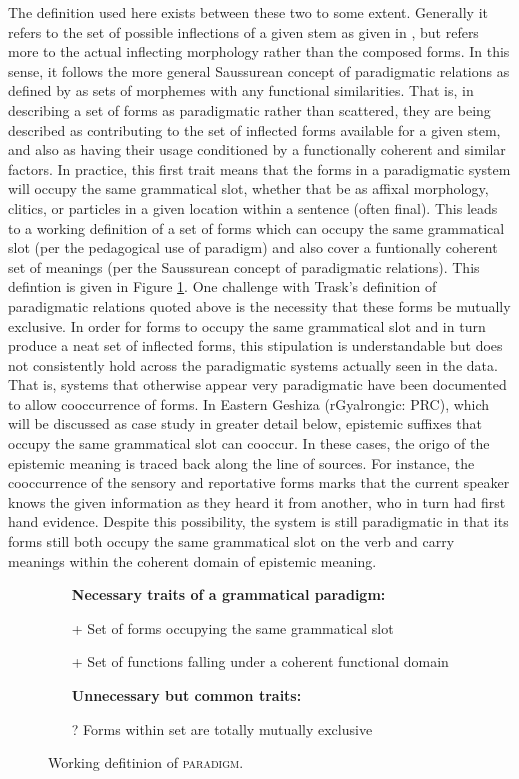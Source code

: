 The definition used here exists between these two to some extent. Generally it refers to the set of possible inflections of a given stem as given in , but refers more to the actual inflecting morphology rather than the composed forms. In this sense, it follows the more general Saussurean concept of paradigmatic relations as defined by  as sets of morphemes with any functional similarities. That is, in describing a set of forms as paradigmatic rather than scattered, they are being described as contributing to the set of inflected forms available for a given stem, and also as having their usage conditioned by a functionally coherent and similar factors. In practice, this first trait means that the forms in a paradigmatic system will occupy the same grammatical slot, whether that be as affixal morphology, clitics, or particles in a given location within a sentence (often final). This leads to a working definition of a set of forms which can occupy the same grammatical slot (per the pedagogical use of paradigm) and also cover a funtionally coherent set of meanings (per the Saussurean concept of paradigmatic relations). This defintion is given in Figure \ref{f:Discussion:Paradigm}. One challenge with Trask's definition of paradigmatic relations quoted above is the necessity that these forms be mutually exclusive. In order for forms to occupy the same grammatical slot and in turn produce a neat set of inflected forms, this stipulation is understandable but does not consistently hold across the paradigmatic systems actually seen in the data. That is, systems that otherwise appear very paradigmatic have been documented to allow cooccurrence of forms. In Eastern Geshiza (rGyalrongic: PRC), which will be discussed as case study in greater detail below, epistemic suffixes that occupy the same grammatical slot can cooccur. In these cases, the origo of the epistemic meaning is traced back along the line of sources. For instance, the cooccurrence of the sensory and reportative forms marks that the current speaker knows the given information as they heard it from another, who in turn had first hand evidence. Despite this possibility, the system is still paradigmatic in that its forms still both occupy the same grammatical slot on the verb and carry meanings within the coherent domain of epistemic meaning.

\begin{figure}
    \begin{itemize}
        \item[] \textbf{Necessary traits of a grammatical paradigm:}
        \item[+] Set of forms occupying the same grammatical slot
        \item[+] Set of functions falling under a coherent functional domain
        \item[] \textbf{Unnecessary but common traits:}
        \item[?] Forms within set are totally mutually exclusive
    \end{itemize}
    \caption{Working defitinion of \textsc{paradigm}.}\label{f:Discussion:Paradigm}
\end{figure}

